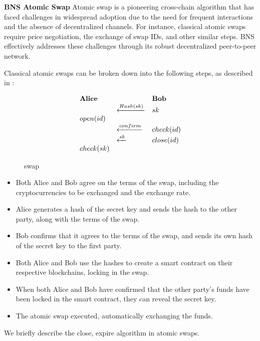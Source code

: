 \documentclass[twocolumn]{article}
\begin{document}
\textbf{BNS Atomic Swap} Atomic swap is a pioneering cross-chain algorithm that has faced challenges in widespread adoption due to the need for frequent interactions and the absence of decentralized channels. For instance, classical atomic swaps require price negotiation, the exchange of swap IDs, and other similar steps. BNS effectively addresses these challenges through its robust decentralized peer-to-peer network.

Classical atomic swaps can be broken down into the following steps, as described in \cite{eth-atomic-swap}:

\begin{figure}
\[
\begin{array}{l l l}
  \text{\textbf{Alice}} & & \text{\textbf{Bob}} \\
    &\xleftarrow{Hash(sk)} & sk  \\
  open(id) & & \\
                        & \xleftarrow{confirm} & check(id) \\
                        & \xleftarrow{sk} & close(id) \\
  check(sk) & & \\
\end{array}
\]
\label{swap}
\caption{swap}
\end{figure}


\begin{itemize}[itemsep=2pt,topsep=0pt,parsep=0pt]

 \item   Both Alice and Bob agree on the terms of the swap, including the cryptocurrencies to be exchanged and the exchange rate.
\item    Alice generates a hash of the secret key and sends the hash to the other party, along with the terms of the swap.
\item     Bob confirms that it agrees to the terms of the swap, and sends its own hash of the secret key to the first party.
\item    Both Alice and Bob use the hashes to create a smart contract on their respective blockchains, locking in the swap.
\item    When both Alice and Bob have confirmed that the other party's funds have been locked in the smart contract, they can reveal the secret key.
\item    The atomic swap executed, automatically exchanging the funds.
\end{itemize}
We briefly describe the close, expire algorithm in atomic swaps.
\end{document}
